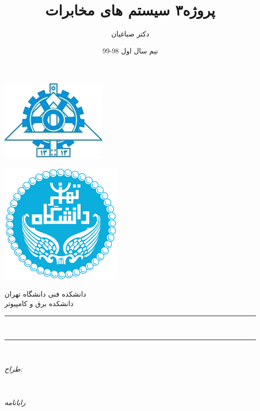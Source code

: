 \documentclass[14pt, professionalfont]{article}
\title{ پروژه۳ سیستم های مخابرات 
	}
\author{دکتر صباغیان}
\date{نیم سال اول 98-99 }
\makeatletter
\let\thetitle\@title
\let\thedate\@date
\makeatother
\begin{document}
	
	\begin{titlepage}
		\centering
		\vspace*{2 cm}
		\begin{minipage}{\textwidth}
			\begin{minipage}{0.5\textwidth}
				\flushright
				\includegraphics[scale = 0.55]{ece.png}
				\vspace*{0.5 cm}
			\end{minipage}
		\begin{minipage}{0.5\textwidth}
			\flushleft
			\includegraphics[scale = 0.30]{ut.png}
			\vspace*{0.5 cm}
		\end{minipage}		
	\end{minipage}

		\textsc{\LARGE دانشکده فنی دانشگاه تهران}\\[0.5 cm]
		\textsc{\Large دانشکده برق و کامپیوتر}\\[0.5 cm]
		\rule{\linewidth}{0.2 mm}
		{ \LARGE \bfseries \thetitle}\\
		\vspace{4pt}
		
		\rule{\linewidth}{0.2 mm} \\[1.5 cm]
		\begin{minipage}{0.2\textwidth}
			\begin{flushright} \large
				\emph{طراح:}\\
				
			\end{flushright}
		\end{minipage}~
		\begin{minipage}{0.3\textwidth}
			\begin{flushleft} \large
				\emph{رایانامه} \\
			\end{flushleft}
		\end{minipage}\\[2 cm]
		{\large \thedate}\\[2 cm]
		\vfill
	\end{titlepage}
\end{document}
